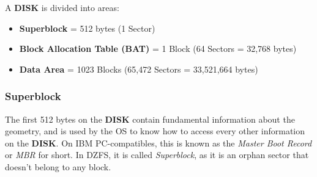 \documentclass[a4paper,11pt]{article}
\begin{document}
    A \textbf{DISK} is divided into areas:

    \begin{itemize}
        \item \textbf{Superblock} = 512 bytes (1 Sector)
        \item \textbf{Block Allocation Table (BAT)} = 1 Block (64 Sectors = 32,768 bytes)
        \item \textbf{Data Area} = 1023 Blocks (65,472 Sectors = 33,521,664 bytes)
    \end{itemize}

        \subsubsection{Superblock}
        The first 512 bytes on the \textbf{DISK} contain fundamental information
        about the geometry, and is used by the OS to know how to access every
        other information on the \textbf{DISK}. On IBM PC-compatibles, this is
        known as the \textit{Master Boot Record} or \textit{MBR} for short. In
        DZFS, it is called \textit{Superblock}, as it is an orphan sector that
        doesn't belong to any block.
\end{document}
